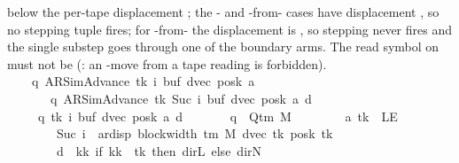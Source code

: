\begin{isabellebody}
{       below the per-tape displacement
       ; the
       - and -from-
       cases have displacement , so no stepping
       tuple fires; for -from-
       the displacement is , so stepping never
       fires and the single substep goes through one of the
       boundary arms.  The read symbol on  must
       not be  (: an
       -move from a tape reading 
       is forbidden).%
}\isanewline
\ \ \ \ {\isacharbraceleft}{\kern0pt}{\isacharparenleft}{\kern0pt}{\isacharparenleft}{\kern0pt}q{\isacharcomma}{\kern0pt}\ AR{\isacharunderscore}{\kern0pt}SimAdvance{\isacharcomma}{\kern0pt}\ tk{\isacharcomma}{\kern0pt}\ i{\isacharcomma}{\kern0pt}\ buf{\isacharcomma}{\kern0pt}\ dvec{\isacharcomma}{\kern0pt}\ posk{\isacharparenright}{\kern0pt}{\isacharcomma}{\kern0pt}\ a{\isacharcomma}{\kern0pt}\isanewline
\ \ \ \ \ \ \ {\isacharparenleft}{\kern0pt}q{\isacharcomma}{\kern0pt}\ AR{\isacharunderscore}{\kern0pt}SimAdvance{\isacharcomma}{\kern0pt}\ tk{\isacharcomma}{\kern0pt}\ Suc\ i{\isacharcomma}{\kern0pt}\ buf{\isacharcomma}{\kern0pt}\ dvec{\isacharcomma}{\kern0pt}\ posk{\isacharparenright}{\kern0pt}{\isacharcomma}{\kern0pt}\ a{\isacharcomma}{\kern0pt}\ d{\isacharparenright}{\kern0pt}\ {\isacharbar}{\kern0pt}\isanewline
\ \ \ \ \ q\ tk\ i\ buf\ dvec\ posk\ a\ d{\isachardot}{\kern0pt}\isanewline
\ \ \ \ \ \ \ q\ {\isasymin}\ Q{\isacharunderscore}{\kern0pt}tm\ M\isanewline
\ \ \ \ \ \ \ {\isasymand}\ a\ tk\ {\isasymnoteq}\ LE{}\isanewline
\ \ \ \ \ \ \ {\isasymand}\ Suc\ i\ {\isacharless}{\kern0pt}\ ar{\isacharunderscore}{\kern0pt}disp\ {\isacharparenleft}{\kern0pt}block{\isacharunderscore}{\kern0pt}width\ {\isacharparenleft}{\kern0pt}{\isasymGamma}{\isacharunderscore}{\kern0pt}tm\ M{\isacharparenright}{\kern0pt}{\isacharparenright}{\kern0pt}\ {\isacharparenleft}{\kern0pt}dvec\ tk{\isacharparenright}{\kern0pt}\ {\isacharparenleft}{\kern0pt}posk\ tk{\isacharparenright}{\kern0pt}\isanewline
\ \ \ \ \ \ \ {\isasymand}\ d\ {\isacharequal}{\kern0pt}\ {\isacharparenleft}{\kern0pt}{\isasymlambda}kk{\isachardot}{\kern0pt}\ if\ kk\ {\isacharequal}{\kern0pt}\ tk\ then\ dir{\isachardot}{\kern0pt}L\ else\ dir{\isachardot}{\kern0pt}N{\isacharparenright}{\kern0pt}{\isacharbraceright}{\kern0pt}\isanewline

\end{isabellebody}
